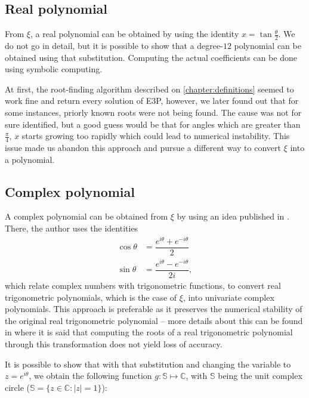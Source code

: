 \subsection{Real polynomial}

From $\xi$, a real polynomial can be obtained by using the identity $x = \tan{\frac{\theta}{2}}$. We do not go in detail, but it is possible to show that a degree-$12$ polynomial can be obtained using that substitution.
Computing the actual coefficients can be done using symbolic computing. 


At first,  the root-finding algorithm described on \autoref{chapter:definitions} seemed to work fine and return every solution of E3P, however, we later found out that for some instances, priorly known roots were not being found. The cause was not for sure identified, but a good guess would be that for angles which are greater than $\frac{\pi}{4}$, $x$ starts growing too rapidly which could lead to numerical instability. This issue made us abandon this approach and pursue a different way to convert $\xi$ into a polynomial.

\subsection{Complex polynomial}

A complex polynomial can be obtained from $\xi$ by using an idea published in . There, the author uses the identities
\begin{align}\label{eq:complex_trig}
	\cos{\theta} &= \dfrac{e^{i\theta} + e^{-i\theta}}{2}\\
	\sin{\theta} &= \dfrac{e^{i\theta} - e^{-i\theta}}{2i},
\end{align}
which relate complex numbers with trigonometric functions, to convert real trigonometric polynomials, which is the case of $\xi$, into univariate complex polynomials.
This approach is preferable as it preserves the numerical stability of the original real trigonometric polynomial -- more details about this can be found in  where it is said that computing the roots of a real trigonometric polynomial through this transformation does not yield loss of accuracy.

It is possible to show that with that substitution and changing the variable to $z=e^{i\theta}$, we obtain the following function $g : \mathbb{S} \mapsto \mathbb{C}$, with $\mathbb{S}$ being the unit complex circle ($\mathbb{S} = \{z \in \mathbb{C} : |z|=1\}$):

